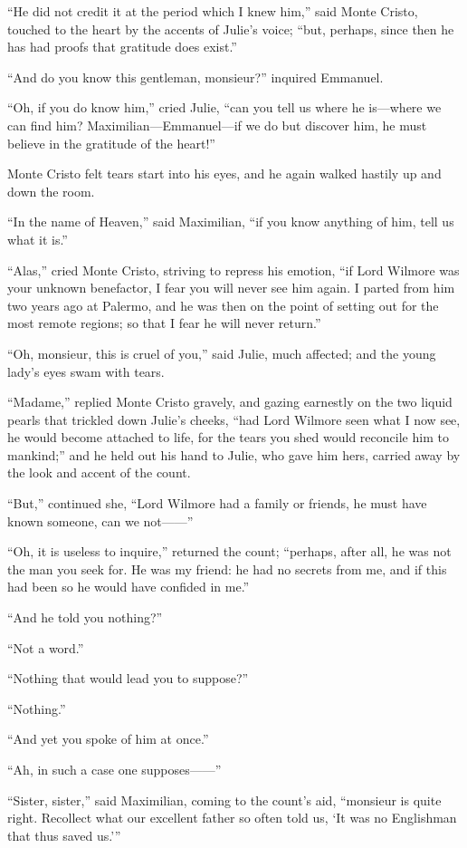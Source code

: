 “He did not credit it at the period which I knew him,” said Monte
Cristo, touched to the heart by the accents of Julie’s voice; “but,
perhaps, since then he has had proofs that gratitude does exist.”

“And do you know this gentleman, monsieur?” inquired Emmanuel.

“Oh, if you do know him,” cried Julie, “can you tell us where he
is—where we can find him? Maximilian—Emmanuel—if we do but discover
him, he must believe in the gratitude of the heart!”

Monte Cristo felt tears start into his eyes, and he again walked
hastily up and down the room.

“In the name of Heaven,” said Maximilian, “if you know anything of him,
tell us what it is.”

“Alas,” cried Monte Cristo, striving to repress his emotion, “if Lord
Wilmore was your unknown benefactor, I fear you will never see him
again. I parted from him two years ago at Palermo, and he was then on
the point of setting out for the most remote regions; so that I fear he
will never return.”

“Oh, monsieur, this is cruel of you,” said Julie, much affected; and
the young lady’s eyes swam with tears.

“Madame,” replied Monte Cristo gravely, and gazing earnestly on the two
liquid pearls that trickled down Julie’s cheeks, “had Lord Wilmore seen
what I now see, he would become attached to life, for the tears you
shed would reconcile him to mankind;” and he held out his hand to
Julie, who gave him hers, carried away by the look and accent of the
count.

“But,” continued she, “Lord Wilmore had a family or friends, he must
have known someone, can we not——”

“Oh, it is useless to inquire,” returned the count; “perhaps, after
all, he was not the man you seek for. He was my friend: he had no
secrets from me, and if this had been so he would have confided in me.”

“And he told you nothing?”

“Not a word.”

“Nothing that would lead you to suppose?”

“Nothing.”

“And yet you spoke of him at once.”

“Ah, in such a case one supposes——”

“Sister, sister,” said Maximilian, coming to the count’s aid, “monsieur
is quite right. Recollect what our excellent father so often told us,
‘It was no Englishman that thus saved us.’”

